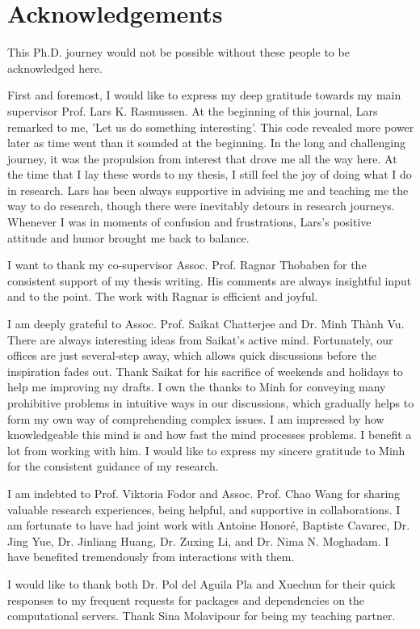 \chapter{Acknowledgements}
This Ph.D. journey would not be possible without these people to be acknowledged here.

First and foremost, I would like to express my deep gratitude towards my main supervisor Prof. Lars K. Rasmussen. At the beginning of this journal, Lars remarked to me, 'Let us do something interesting'. This code revealed more power later as time went than it sounded at the beginning. In the long and challenging journey, it was the propulsion from interest that drove me all the way here. At the time that I lay these words to my thesis, I still feel the joy of doing what I do in research. Lars has been always supportive in advising me and teaching me the way to do research, though there were inevitably detours in research journeys. Whenever I was in moments of confusion and frustrations, Lars's positive attitude and humor brought me back to balance.

I want to thank my co-supervisor Assoc. Prof. Ragnar Thobaben for the consistent support of my thesis writing. His comments are always insightful input and to the point. The work with Ragnar is efficient and joyful. 

I am deeply grateful to Assoc. Prof. Saikat Chatterjee and Dr. Minh Th\`{a}nh Vu. There are always interesting ideas from Saikat's active mind. Fortunately, our offices are just several-step away, which allows quick discussions before the inspiration fades out. Thank Saikat for his sacrifice of weekends and holidays to help me improving my drafts.
I own the thanks to Minh for conveying many prohibitive problems in intuitive ways in our discussions, which gradually helps to form my own way of comprehending complex issues. I am impressed by how knowledgeable this mind is and how fast the mind processes problems. I benefit a lot from working with him. I would like to express my sincere gratitude to Minh for the consistent guidance of my research.

I am indebted to Prof. Viktoria Fodor and Assoc. Prof. Chao Wang for sharing valuable research experiences, being helpful, and supportive in collaborations. I am fortunate to have had joint work with Antoine Honor{\'e}, Baptiste Cavarec, Dr. Jing Yue, Dr. Jinliang Huang, Dr. Zuxing Li, and Dr. Nima N. Moghadam. I have benefited tremendously from interactions with them.

I would like to thank both Dr. Pol del Aguila Pla and Xuechun for their quick responses to my frequent requests for packages and dependencies on the computational servers. Thank Sina Molavipour for being my teaching partner.


